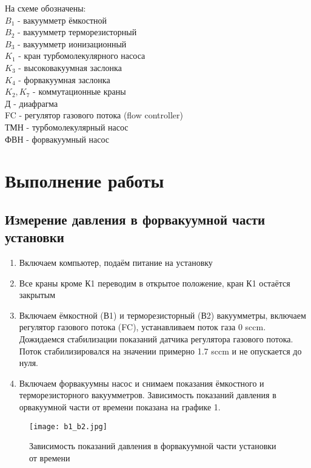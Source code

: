 \documentclass{article}
\begin{document}
На схеме обозначены: \\
$B_1$ - вакуумметр ёмкостной\\
$B_2$ - вакуумметр терморезисторный\\
$B_3$ - вакуумметр ионизационный\\
$K_1$ - кран турбомолекулярного насоса\\
$K_3$ - высоковакуумная заслонка\\
$K_4$ - форвакуумная заслонка\\
$K_2, K_7$ - коммутационные краны\\
Д - диафрагма\\
FC - регулятор газового потока (flow controller)\\
ТМН - турбомолекулярный насос\\
ФВН - форвакуумный насос\\

\section{Выполнение работы}
\subsection{Измерение давления в форвакуумной части установки}
\begin{enumerate}
    \item Включаем компьютер, подаём питание на установку
    \item Все краны кроме К1 переводим в открытое положение, кран К1 остаётся закрытым
    \item Включаем ёмкостной (В1) и терморезисторный (В2) вакуумметры, включаем регулятор газового потока (FC), устанавливаем поток газа 0 sccm. Дожидаемся стабилизации показаний датчика регулятора газового потока. Поток стабилизировался на значении примерно 1.7 sccm и не опускается до нуля. 
    \item Включаем форвакуумны насос и снимаем показания ёмкостного и терморезисторного вакуумметров. Зависимость показаний давления в орвакуумной части от времени показана на графике 1.
\end{enumerate}

\begin{figure}[h]
    \centering
    \texttt{[image: b1\_b2.jpg]}
    \caption{Зависимость показаний давления в форвакуумной части установки от времени}
    \label{fig:vac}
\end{figure}
\end{document}
